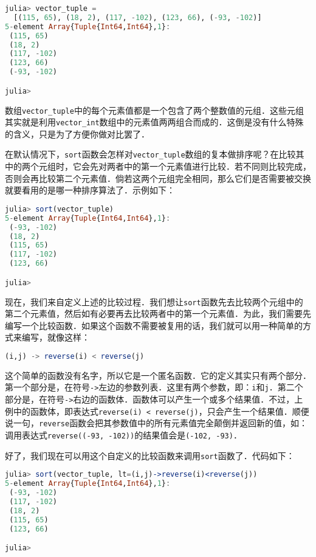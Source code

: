 \begin{lstlisting}[language=julia]
julia> vector_tuple = 
  [(115, 65), (18, 2), (117, -102), (123, 66), (-93, -102)]
5-element Array{Tuple{Int64,Int64},1}:
 (115, 65)  
 (18, 2)    
 (117, -102)
 (123, 66)  
 (-93, -102)

julia> 
\end{lstlisting}

数组\verb|vector_tuple|中的每个元素值都是一个包含了两个整数值的元组．这些元组其实就是利用\verb|vector_int|数组中的元素值两两组合而成的．这倒是没有什么特殊的含义，只是为了方便你做对比罢了．

在默认情况下，\verb|sort|函数会怎样对\verb|vector_tuple|数组的复本做排序呢？在比较其中的两个元组时，它会先对两者中的第一个元素值进行比较．若不同则比较完成，否则会再比较第二个元素值．倘若这两个元组完全相同，那么它们是否需要被交换就要看用的是哪一种排序算法了．示例如下：

\begin{lstlisting}[language=julia]
julia> sort(vector_tuple)
5-element Array{Tuple{Int64,Int64},1}:
 (-93, -102)
 (18, 2)    
 (115, 65)  
 (117, -102)
 (123, 66)  

julia> 
\end{lstlisting}

现在，我们来自定义上述的比较过程．我们想让\verb|sort|函数先去比较两个元组中的第二个元素值，然后如有必要再去比较两者中的第一个元素值．为此，我们需要先编写一个比较函数．如果这个函数不需要被复用的话，我们就可以用一种简单的方式来编写，就像这样：

\begin{lstlisting}[language=julia]
(i,j) -> reverse(i) < reverse(j)
\end{lstlisting}

这个简单的函数没有名字，所以它是一个匿名函数．它的定义其实只有两个部分．第一个部分是，在符号\verb|->|左边的参数列表．这里有两个参数，即：\verb|i|和\verb|j|．第二个部分是，在符号\verb|->|右边的函数体．函数体可以产生一个或多个结果值．不过，上例中的函数体，即表达式\verb|reverse(i) < reverse(j)|，只会产生一个结果值．顺便说一句，\verb|reverse|函数会把其参数值中的所有元素值完全颠倒并返回新的值，如：调用表达式\verb|reverse((-93, -102))|的结果值会是\verb|(-102, -93)|．

好了，我们现在可以用这个自定义的比较函数来调用\verb|sort|函数了．代码如下：

\begin{lstlisting}[language=julia]
julia> sort(vector_tuple, lt=(i,j)->reverse(i)<reverse(j))
5-element Array{Tuple{Int64,Int64},1}:
 (-93, -102)
 (117, -102)
 (18, 2)    
 (115, 65)  
 (123, 66)  

julia> 
\end{lstlisting}

